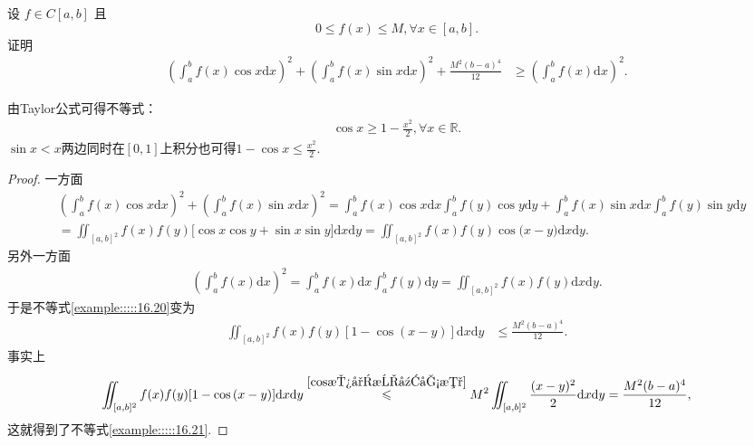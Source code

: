 \documentclass[../../main.tex]{subfiles}%
\begin{document}
\begin{example}
设 $f \in C[a,b]$ 且
\[0 \leqslant f(x) \leqslant M, \forall x \in [a,b].\]
证明
\begin{align}\label{example:::::16.20}
\left(\int_{a}^{b}f(x)\cos x\mathrm{d}x\right)^2 + \left(\int_{a}^{b}f(x)\sin x\mathrm{d}x\right)^2 + \frac{M^2(b - a)^4}{12} &\geqslant \left(\int_{a}^{b}f(x)\mathrm{d}x\right)^2.
\end{align}
\end{example}
\begin{remark}
由Taylor公式可得不等式：
\begin{align}\label{cos放小成幂函数}
\cos x\geqslant  1-\frac{x^2}{2},\forall x\in \mathbb{R}.
\end{align}
$\sin x<x$两边同时在$[0,1]$上积分也可得$1-\cos x\leqslant \frac{x^2}{2}$.
\end{remark}
\begin{proof}

一方面
\begin{align*}
&\left( \int_a^b{f(x)\cos x\mathrm{d}x} \right) ^2+\left( \int_a^b{f(x)\sin x\mathrm{d}x} \right) ^2=\int_a^b{f(x)\cos x\mathrm{d}x}\int_a^b{f(y)\cos y\mathrm{d}y}+\int_a^b{f(x)\sin x\mathrm{d}x}\int_a^b{f(y)\sin y\mathrm{d}y}
\\
&=\iint_{[a,b]^2}{f(x)f(y)[\cos x\cos y}+\sin x\sin y]\mathrm{d}x\mathrm{d}y=\iint_{[a,b]^2}{f(x)f(y)\cos\mathrm{(}x}-y)\mathrm{d}x\mathrm{d}y.
\end{align*}
另外一方面
\begin{align*}
\left( \int_a^b{f(x)\mathrm{d}x} \right) ^2=\int_a^b{f(x)\mathrm{d}x}\int_a^b{f(y)\mathrm{d}y}=\iint_{[a,b]^2}{f(x)f(y)\mathrm{d}x\mathrm{d}y.}
\end{align*}
于是不等式\eqref{example:::::16.20}变为
\begin{align}\label{example:::::16.21}
\iint_{[a,b]^2}f(x)f(y)[1 - \cos(x - y)]\mathrm{d}x\mathrm{d}y &\leqslant \frac{M^2(b - a)^4}{12}.
\end{align}
事实上
\begin{align*}
\iint_{[a,b]^2}{f(x)f(y)[1}-\cos\mathrm{(}x-y)]\mathrm{d}x\mathrm{d}y\overset{\eqref{cos放小成幂函数}}{\leqslant}M^2\iint_{[a,b]^2}{\frac{(x-y)^2}{2}\mathrm{d}x\mathrm{d}y}=\frac{M^2(b-a)^4}{12},
\end{align*}
这就得到了不等式\eqref{example:::::16.21}. 

\end{proof}
\end{document}
